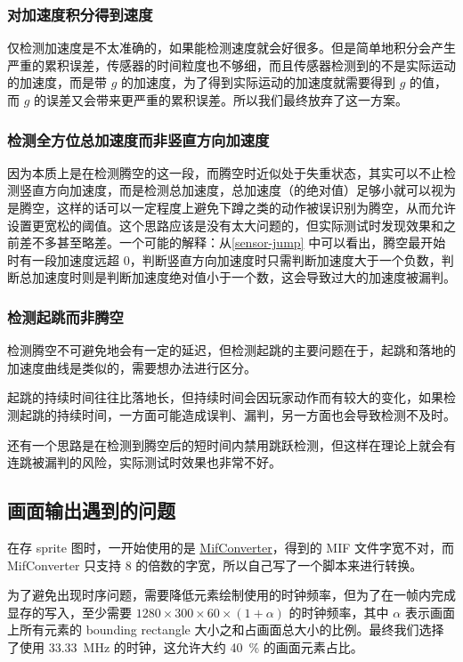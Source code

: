 \documentclass[UTF8, 11pt, fontset=none]{ctexart}
\begin{document}
\subsubsection{对加速度积分得到速度}

仅检测加速度是不太准确的，如果能检测速度就会好很多。但是简单地积分会产生严重的累积误差，传感器的时间粒度也不够细，而且传感器检测到的不是实际运动的加速度，而是带 $g$ 的加速度，为了得到实际运动的加速度就需要得到 $g$ 的值，而 $g$ 的误差又会带来更严重的累积误差。所以我们最终放弃了这一方案。

\subsubsection{检测全方位总加速度而非竖直方向加速度}

因为本质上是在检测腾空的这一段，而腾空时近似处于失重状态，其实可以不止检测竖直方向加速度，而是检测总加速度，总加速度（的绝对值）足够小就可以视为是腾空，这样的话可以一定程度上避免下蹲之类的动作被误识别为腾空，从而允许设置更宽松的阈值。这个思路应该是没有太大问题的，但实际测试时发现效果和之前差不多甚至略差。一个可能的解释：从\cref{sensor-jump} 中可以看出，腾空最开始时有一段加速度远超 $0$，判断竖直方向加速度时只需判断加速度大于一个负数，判断总加速度时则是判断加速度绝对值小于一个数，这会导致过大的加速度被漏判。

\subsubsection{检测起跳而非腾空}

检测腾空不可避免地会有一定的延迟，但检测起跳的主要问题在于，起跳和落地的加速度曲线是类似的，需要想办法进行区分。

起跳的持续时间往往比落地长，但持续时间会因玩家动作而有较大的变化，如果检测起跳的持续时间，一方面可能造成误判、漏判，另一方面也会导致检测不及时。

还有一个思路是在检测到腾空后的短时间内禁用跳跃检测，但这样在理论上就会有连跳被漏判的风险，实际测试时效果也非常不好。

\subsection{画面输出遇到的问题}

在存 sprite 图时，一开始使用的是 \href{https://github.com/thu-cs-lab/MifConverter}{MifConverter}，得到的 MIF 文件字宽不对，而 MifConverter 只支持 8 的倍数的字宽，所以自己写了一个脚本来进行转换。

为了避免出现时序问题，需要降低元素绘制使用的时钟频率，但为了在一帧内完成显存的写入，至少需要 $1280 \times 300 \times 60 \times (1+\alpha)$ 的时钟频率，其中 $\alpha$ 表示画面上所有元素的 bounding rectangle 大小之和占画面总大小的比例。最终我们选择了使用 \SI{33.33}{\mega\hertz} 的时钟，这允许大约 \SI{40}{\percent} 的画面元素占比。
\end{document}
